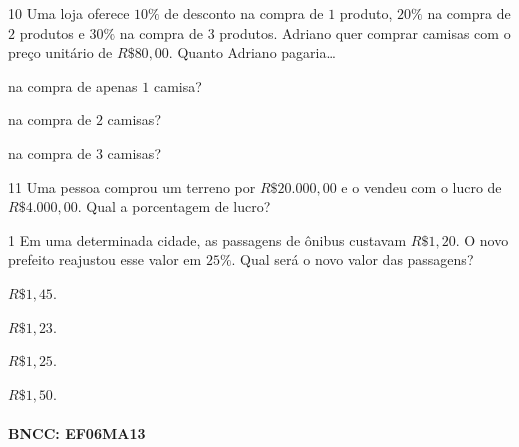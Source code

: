 
\num{10}  Uma loja oferece $10\%$ de desconto na compra de $1$ produto, $20\%$ na
compra de $2$ produtos e $30\%$ na compra de $3$ produtos. Adriano quer
comprar camisas com o preço unitário de $R\$80,00$. Quanto Adriano
pagaria\ldots{}

\begin{escolha}
\item na compra de apenas $1$ camisa? 
\item na compra de $2$ camisas? 
\item na compra de $3$ camisas? 
\end{escolha}

\num{11}  Uma pessoa comprou um terreno por $R\$20.000,00$ e o vendeu com o
lucro de $R\$4.000,00$. Qual a porcentagem de lucro?



\num{1}  Em uma determinada cidade, as passagens de ônibus custavam $R\$1,20$. O
novo prefeito reajustou esse valor em $25\%$. Qual será o novo valor das
passagens?

\begin{escolha}
\item $R\$1,45$.
\item $R\$1,23$.
\item $R\$1,25$.
\item $R\$1,50$.
\end{escolha}

\paragraph{BNCC: EF06MA13 }


